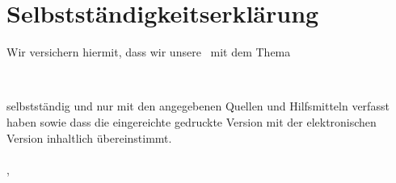 
\newpage
\section*{Selbstständigkeitserklärung}
Wir versichern hiermit, dass wir unsere \mytexttype \ mit dem Thema
\begin{center}
\textbf{{\large \mytitle} \\ \mysubtitle}
\end{center}
selbstständig und nur mit den angegebenen Quellen und Hilfsmitteln verfasst haben sowie dass die eingereichte gedruckte Version mit der elektronischen Version inhaltlich übereinstimmt.\\
\\
\vspace{15mm}
\noindent{}\mysubmissionplace , \mydate
\\
\begin{minipage}[t]{\textwidth}
\centering \dotfill \\
\myauthor
\end{minipage}